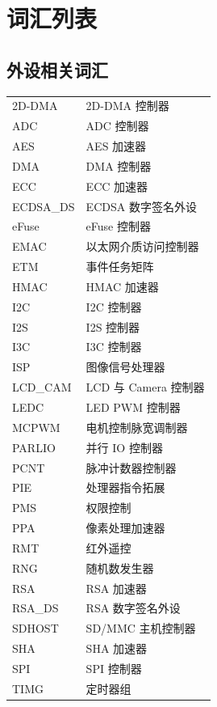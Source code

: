 \section*{词汇列表}\label{glossary}
\rhead{\Navigation}

\subsection*{外设相关词汇}

\begin{longtable}[c]{p{3cm}p{12cm} }

2D-DMA & 2D-DMA 控制器 \\
ADC & ADC 控制器 \\
AES & AES 加速器 \\
DMA & DMA 控制器 \\
ECC & ECC 加速器 \\
ECDSA\_DS & ECDSA 数字签名外设 \\
eFuse & eFuse 控制器 \\
EMAC & 以太网介质访问控制器 \\
ETM & 事件任务矩阵 \\
HMAC & HMAC 加速器 \\
I2C & I2C 控制器 \\
I2S & I2S 控制器 \\
I3C & I3C 控制器 \\
ISP & 图像信号处理器 \\
LCD\_CAM & LCD 与 Camera 控制器 \\
LEDC & LED PWM 控制器 \\
MCPWM & 电机控制脉宽调制器 \\
PARLIO & 并行 IO 控制器 \\
PCNT & 脉冲计数器控制器 \\
PIE & 处理器指令拓展 \\
PMS & 权限控制 \\
PPA & 像素处理加速器 \\
RMT & 红外遥控 \\
RNG & 随机数发生器 \\
RSA & RSA 加速器 \\
RSA\_DS & RSA 数字签名外设 \\
SDHOST & SD/MMC 主机控制器 \\
SHA & SHA 加速器 \\
SPI & SPI 控制器 \\
TIMG & 定时器组 \\

\end{longtable}
